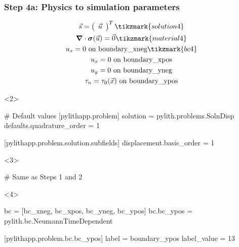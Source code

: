 \documentclass[aspectratio=169]{beamer}
\begin{document}
\begin{frame}[t,fragile]
  \frametitle{Step 4a: Physics to simulation parameters}
  \summary{}

  \begin{minipage}[t]{0.3\textwidth}
    {\scriptsize
    \begin{gather*}
        \vec{s} = \left(\begin{array}{c} \vec{u} \end{array}\right)^T \tikzmark{solution4}\\
        \tensor{\nabla} \cdot \tensor{\sigma}(\vec{u}) = \vec{0} \tikzmark{material4}\\
        u_x = 0 \text{ on boundary\_xneg} \tikzmark{bc4}\\
        u_x = 0 \text{ on boundary\_xpos} \\
        u_y = 0 \text{ on boundary\_yneg} \\
        \tau_n = \tau_0(\vec{x}) \text{ on boundary\_ypos}
    \end{gather*}}
  \end{minipage}
  \hfill
  \begin{minipage}[t]{0.67\textwidth}
    \begin{onlyenv}<2>
      \begin{cfgcode}
        # Default values
        [pylithapp.problem]
        solution = pylith.problems.SolnDisp
        defaults.quadrature_order = 1
        
        [pylithapp.problem.solution.subfields]
        displacement.basis_order = 1
      \end{cfgcode}
    \end{onlyenv}
    \begin{onlyenv}<3>
      \begin{cfgcode}
        # Same as Steps 1 and 2
      \end{cfgcode}
    \end{onlyenv}
    \begin{onlyenv}<4>
      \begin{cfgcode}
        bc = [bc_xneg, bc_xpos, bc_yneg, bc_ypos]
        bc.bc_ypos = pylith.bc.NeumannTimeDependent

        [pylithapp.problem.bc.bc_ypos]
        label = boundary_ypos
        label_value = 13


\end{cfgcode}
\end{onlyenv}
\end{minipage}
\end{frame}
\end{document}
